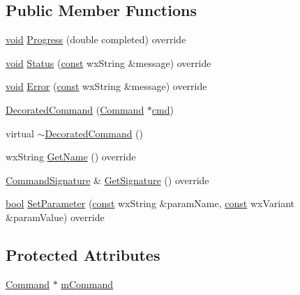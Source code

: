 \subsection*{Public Member Functions}
\begin{DoxyCompactItemize}
\item 
\hyperlink{sound_8c_ae35f5844602719cf66324f4de2a658b3}{void} \hyperlink{class_decorated_command_a018687455651d26c8d55f8b5c7dbe26a}{Progress} (double completed) override
\item 
\hyperlink{sound_8c_ae35f5844602719cf66324f4de2a658b3}{void} \hyperlink{class_decorated_command_adebf0439ca5f171f989062ef35dfb2f1}{Status} (\hyperlink{getopt1_8c_a2c212835823e3c54a8ab6d95c652660e}{const} wx\+String \&message) override
\item 
\hyperlink{sound_8c_ae35f5844602719cf66324f4de2a658b3}{void} \hyperlink{class_decorated_command_a21a25d445037662511dec861196b3bd0}{Error} (\hyperlink{getopt1_8c_a2c212835823e3c54a8ab6d95c652660e}{const} wx\+String \&message) override
\item 
\hyperlink{class_decorated_command_afc8b9fd753df1d8da6fcf08adb1dd76b}{Decorated\+Command} (\hyperlink{class_command}{Command} $\ast$\hyperlink{sndfile__play_8m_adfc5ba7e22f5e4a6221c12a70503bef3}{cmd})
\item 
virtual \hyperlink{class_decorated_command_a4f951cfcf04bb2fd197d4a51bb63d30c}{$\sim$\+Decorated\+Command} ()
\item 
wx\+String \hyperlink{class_decorated_command_abb878cd2b4e2859aa3c5085361ffa2ae}{Get\+Name} () override
\item 
\hyperlink{class_command_signature}{Command\+Signature} \& \hyperlink{class_decorated_command_a0099c48c3d13139d8ba17d8accabed54}{Get\+Signature} () override
\item 
\hyperlink{mac_2config_2i386_2lib-src_2libsoxr_2soxr-config_8h_abb452686968e48b67397da5f97445f5b}{bool} \hyperlink{class_decorated_command_a9e0d941731595825ce270c9ab2c09134}{Set\+Parameter} (\hyperlink{getopt1_8c_a2c212835823e3c54a8ab6d95c652660e}{const} wx\+String \&param\+Name, \hyperlink{getopt1_8c_a2c212835823e3c54a8ab6d95c652660e}{const} wx\+Variant \&param\+Value) override
\end{DoxyCompactItemize}
\subsection*{Protected Attributes}
\begin{DoxyCompactItemize}
\item 
\hyperlink{class_command}{Command} $\ast$ \hyperlink{class_decorated_command_aae0c3e0ac3ae92218a869663c78aa322}{m\+Command}
\end{DoxyCompactItemize}


